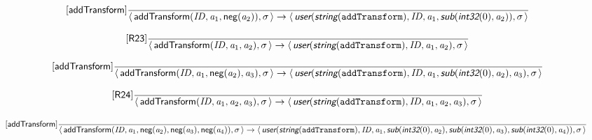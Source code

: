 \documentclass[10pt,leqno]{article}
\newcommand{\artVariable}[1]{\mbox{\em #1\/}}
\newcommand{\artConstructor}[1]{\mbox{\sf #1}}
\newcommand{\artCaseInsensitiveLiteral}[1]{\mbox{\tt #1}}
\newcommand{\artSpecial}[1]{\mbox{\sf\em #1}}
\begin{document}
\begin{equation}
\tag*{[\artConstructor{\sf addTransform}]}\frac{}{\langle\, \artConstructor{\sf addTransform}(\artVariable{ID}, \artVariable{a$_{1}$}, \artConstructor{\sf neg}(\artVariable{a$_{2}$})), \artVariable{$\sigma$}\,\rangle \rightarrow \langle\, \artSpecial{user}(\artSpecial{string}(\artCaseInsensitiveLiteral{addTransform}), \artVariable{ID}, \artVariable{a$_{1}$}, \artSpecial{sub}(\artSpecial{int32}(0), \artVariable{a$_{2}$})), \artVariable{$\sigma$}\,\rangle }
\end{equation}

\begin{equation}
\tag*{[\artConstructor{\sf R23}]}\frac{}{\langle\, \artConstructor{\sf addTransform}(\artVariable{ID}, \artVariable{a$_{1}$}, \artVariable{a$_{2}$}), \artVariable{$\sigma$}\,\rangle \rightarrow \langle\, \artSpecial{user}(\artSpecial{string}(\artCaseInsensitiveLiteral{addTransform}), \artVariable{ID}, \artVariable{a$_{1}$}, \artVariable{a$_{2}$}), \artVariable{$\sigma$}\,\rangle }
\end{equation}

\begin{equation}
\tag*{[\artConstructor{\sf addTransform}]}\frac{}{\langle\, \artConstructor{\sf addTransform}(\artVariable{ID}, \artVariable{a$_{1}$}, \artConstructor{\sf neg}(\artVariable{a$_{2}$}), \artVariable{a$_{3}$}), \artVariable{$\sigma$}\,\rangle \rightarrow \langle\, \artSpecial{user}(\artSpecial{string}(\artCaseInsensitiveLiteral{addTransform}), \artVariable{ID}, \artVariable{a$_{1}$}, \artSpecial{sub}(\artSpecial{int32}(0), \artVariable{a$_{2}$}), \artVariable{a$_{3}$}), \artVariable{$\sigma$}\,\rangle }
\end{equation}

\begin{equation}
\tag*{[\artConstructor{\sf R24}]}\frac{}{\langle\, \artConstructor{\sf addTransform}(\artVariable{ID}, \artVariable{a$_{1}$}, \artVariable{a$_{2}$}, \artVariable{a$_{3}$}), \artVariable{$\sigma$}\,\rangle \rightarrow \langle\, \artSpecial{user}(\artSpecial{string}(\artCaseInsensitiveLiteral{addTransform}), \artVariable{ID}, \artVariable{a$_{1}$}, \artVariable{a$_{2}$}, \artVariable{a$_{3}$}), \artVariable{$\sigma$}\,\rangle }
\end{equation}

\begin{equation}
\tag*{[\artConstructor{\sf addTransform}]}\frac{}{\langle\, \artConstructor{\sf addTransform}(\artVariable{ID}, \artVariable{a$_{1}$}, \artConstructor{\sf neg}(\artVariable{a$_{2}$}), \artConstructor{\sf neg}(\artVariable{a$_{3}$}), \artConstructor{\sf neg}(\artVariable{a$_{4}$})), \artVariable{$\sigma$}\,\rangle \rightarrow \langle\, \artSpecial{user}(\artSpecial{string}(\artCaseInsensitiveLiteral{addTransform}), \artVariable{ID}, \artVariable{a$_{1}$}, \artSpecial{sub}(\artSpecial{int32}(0), \artVariable{a$_{2}$}), \artSpecial{sub}(\artSpecial{int32}(0), \artVariable{a$_{3}$}), \artSpecial{sub}(\artSpecial{int32}(0), \artVariable{a$_{4}$})), \artVariable{$\sigma$}\,\rangle }
\end{equation}
\end{document}
